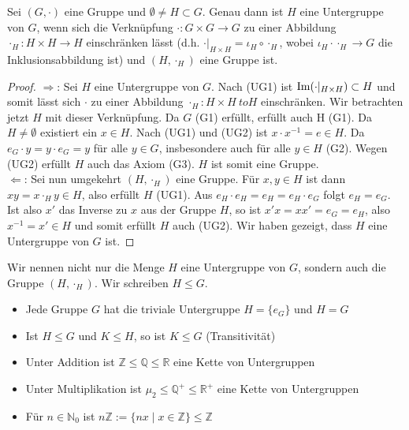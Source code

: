 \begin{proposition}
	Sei $(G,\cdot)$ eine Gruppe und $\emptyset \neq H \subset G$. Genau dann ist
	$H$ eine Untergruppe von $G$, wenn sich die Verknüpfung $\cdot: G \times G \to G$ zu einer
	Abbildung $\cdot_H: H \times H \to H$ einschränken lässt (d.h. $\cdot\vert_{H \times H}=
	\iota_H \circ \cdot_H$, wobei $\iota_H \cdot \cdot_H \to G$ die Inklusionsabbildung ist) und
	$(H,\cdot_H)$ eine Gruppe ist.
\end{proposition}
\begin{proof}
	$\Rightarrow$: Sei $H$ eine Untergruppe von $G$. Nach (UG1) ist $\operatorname{Im}(\cdot|_{H \times H}) \subset H$
	und somit lässt sich $\cdot$ zu einer Abbildung $\cdot_H: H \times H \ to H$ einschränken. Wir 
	betrachten jetzt $H$ mit dieser Verknüpfung. Da $G$ (G1) erfüllt, erfüllt auch H (G1). Da
	$H \neq \emptyset$ existiert ein $x \in H$. Nach (UG1) und (UG2) ist $x \cdot x^{-1}=e \in H$. Da 
	$e_G \cdot y=y \cdot e_G=y$ für alle $y \in G$, insbesondere auch für alle $y \in H$ (G2). Wegen
	(UG2) erfüllt $H$ auch das Axiom (G3). $H$ ist somit eine Gruppe. \\
	$\Leftarrow$: Sei nun umgekehrt $(H,\cdot_H)$ eine Gruppe. Für $x,y \in H$ ist dann $xy=x \cdot_H
	y \in H$, also erfüllt $H$ (UG1). Aus $e_H \cdot e_H=e_H=e_H \cdot e_G$ folgt $e_H=e_G$. Ist also
	$x'$ das Inverse zu $x$ aus der Gruppe $H$, so ist $x'x=xx'=e_G=e_H$, also $x^{-1}=x' \in H$ und
	somit erfüllt $H$ auch (UG2). Wir haben gezeigt, dass $H$ eine Untergruppe von $G$ ist.
\end{proof}

\begin{remark}
	Wir nennen nicht nur die Menge $H$ eine Untergruppe von $G$, sondern auch die Gruppe $(H,\cdot_H)$.
	Wir schreiben $H \le G$.
\end{remark}

\begin{example}
	\begin{itemize}
		\item Jede Gruppe $G$ hat die triviale Untergruppe $H=\{e_G\}$ und $H=G$
		\item Ist $H \le G$ und $K \le H$, so ist $K \le G$ (Transitivität)
		\item Unter Addition ist $\mathbb{Z} \le \mathbb{Q} \le \mathbb{R}$ eine Kette von Untergruppen
		\item Unter Multiplikation ist $\mu_2 \le \mathbb{Q}^+ \le \mathbb{R}^+$ eine Kette von 
		Untergruppen
		\item Für $n \in \mathbb{N}_0$ ist $n\mathbb{Z} := \{nx \mid x \in \mathbb{Z}\} \le \mathbb{Z}$ 
	\end{itemize}
\end{example}

